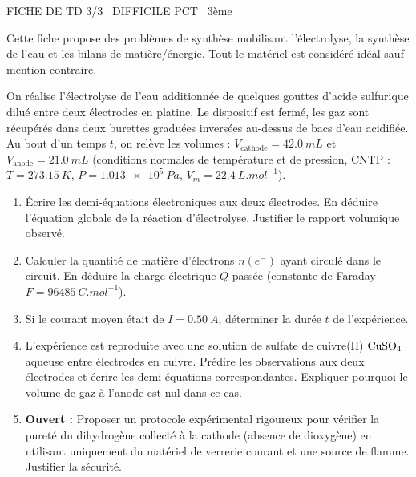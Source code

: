 \documentclass[11pt]{article}
\begin{document}
\begin{tcolorbox}[enhanced,colback=popink,colframe=popink,arc=10pt,boxrule=0pt,left=12pt,right=12pt,top=9pt,bottom=9pt]
{\color{white}\popxbold\small FICHE DE TD 3/3 \textbullet\ DIFFICILE \hfill PCT \textbullet\ 3ème\par}
\end{tcolorbox}
\vspace{4pt}
Cette fiche propose des problèmes de synthèse mobilisant l'électrolyse, la synthèse de l'eau et les bilans de matière/énergie. Tout le matériel est considéré idéal sauf mention contraire.

\begin{exercice}
On réalise l'électrolyse de l'eau additionnée de quelques gouttes d'acide sulfurique dilué entre deux électrodes en platine. Le dispositif est fermé, les gaz sont récupérés dans deux burettes graduées inversées au-dessus de bacs d'eau acidifiée. Au bout d'un temps $t$, on relève les volumes : $V_{\text{cathode}} = \SI{42,0}{mL}$ et $V_{\text{anode}} = \SI{21,0}{mL}$ (conditions normales de température et de pression, CNTP : $T=\SI{273,15}{K}$, $P=\SI{1,013e5}{Pa}$, $V_m=\SI{22,4}{L.mol^{-1}}$).
\begin{enumerate}
    \item Écrire les demi-équations électroniques aux deux électrodes. En déduire l'équation globale de la réaction d'électrolyse. Justifier le rapport volumique observé.
    \item Calculer la quantité de matière d'électrons $n(e^-)$ ayant circulé dans le circuit. En déduire la charge électrique $Q$ passée (constante de Faraday $F=\SI{96485}{C.mol^{-1}}$).
    \item Si le courant moyen était de $I=\SI{0,50}{A}$, déterminer la durée $t$ de l'expérience.
    \item L'expérience est reproduite avec une solution de sulfate de cuivre(II) $\ce{CuSO4}$ aqueuse entre électrodes en cuivre. Prédire les observations aux deux électrodes et écrire les demi-équations correspondantes. Expliquer pourquoi le volume de gaz à l'anode est nul dans ce cas.
    \item \textbf{Ouvert :} Proposer un protocole expérimental rigoureux pour vérifier la pureté du dihydrogène collecté à la cathode (absence de dioxygène) en utilisant uniquement du matériel de verrerie courant et une source de flamme. Justifier la sécurité.
\end{enumerate}
\end{exercice}
\end{document}
